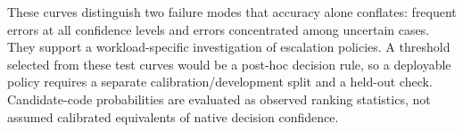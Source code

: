 These curves distinguish two failure modes that accuracy alone conflates: frequent errors at all confidence levels and errors concentrated among uncertain cases. They support a workload-specific investigation of escalation policies. A threshold selected from these test curves would be a post-hoc decision rule, so a deployable policy requires a separate calibration/development split and a held-out check. Candidate-code probabilities are evaluated as observed ranking statistics, not assumed calibrated equivalents of native decision confidence.
